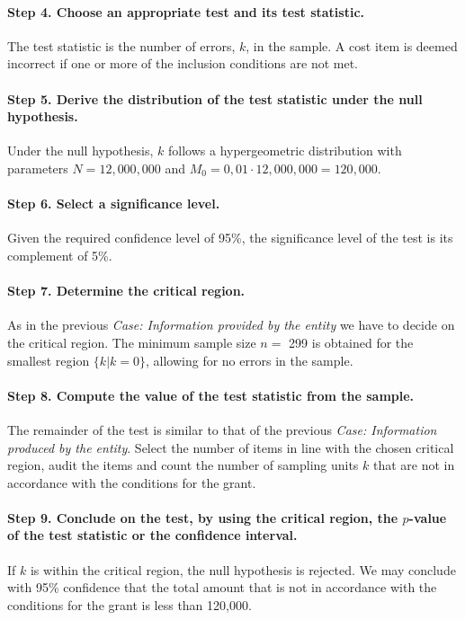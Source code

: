\paragraph{Step 4. Choose an appropriate test and its test statistic.} The test statistic is the number of errors, $k$, in the sample. A cost item is deemed incorrect if one or more of the inclusion conditions are not met.

\paragraph{Step 5. Derive the distribution of the test statistic under the null hypothesis.} Under the null hypothesis, $k$ follows a hypergeometric distribution with parameters $N = 12,000,000$ and $M_0 = 0,01 \cdot 12,000,000 = 120,000$.

\paragraph{Step 6. Select a significance level.} Given the required confidence level of 95\%, the significance level of the test is its complement of 5\%.

\paragraph{Step 7. Determine the critical region.} As in the previous \emph{Case: Information provided by the entity} we have to decide on the critical region. The minimum sample size $n = $ 299 is obtained for the smallest region $\{k | k = 0\}$, allowing for no errors in the sample. 

\paragraph{Step 8. Compute the value of the test statistic from the sample.} The remainder of the test is similar to that of the previous \emph{Case: Information produced by the entity}. Select the number of items in line with the chosen critical region, audit the items and count the number of sampling units $k$ that are not in accordance with the conditions for the grant.

\paragraph{Step 9. Conclude on the test, by using the critical region, the $p$-value of the test statistic or the confidence interval.} If $k$ is within the critical region, the null hypothesis is rejected. We may conclude with 95\% confidence that the total amount that is not in accordance with the conditions for the grant is less than 120,000. 

